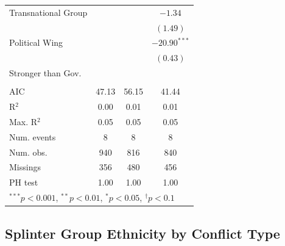 \documentclass[12pt,]{book}
\let\origtable\table
\let\endorigtable\endtable
\renewenvironment{table}[1][2] {
    \singlespacing
    \expandafter\origtable\expandafter[H]
} {
    \endorigtable
}
\theoremstyle{definition}
\theoremstyle{definition}
\theoremstyle{definition}
\theoremstyle{remark}
\begin{document}
\begin{table}
\begin{center}
\begin{tabular}{l c c c }
Transnational Group               &                   &                & $-1.34$        \\
                                  &                   &                & $(1.49)$       \\
Political Wing                    &                   &                & $-20.90^{***}$ \\
                                  &                   &                & $(0.43)$       \\
Stronger than Gov.                &                   &                &                \\
                                  &                   &                &                \\
\hline
AIC                               & 47.13             & 56.15          & 41.44          \\
R$^2$                             & 0.00              & 0.01           & 0.01           \\
Max. R$^2$                        & 0.05              & 0.05           & 0.05           \\
Num. events                       & 8                 & 8              & 8              \\
Num. obs.                         & 940               & 816            & 840            \\
Missings                          & 356               & 480            & 456            \\
PH test                           & 1.00              & 1.00           & 1.00           \\
\hline
\multicolumn{4}{l}{\scriptsize{$^{***}p<0.001$, $^{**}p<0.01$, $^*p<0.05$, $^{\dagger}p<0.1$}}
\end{tabular}
\caption{Cox Proportional Hazard Models of Rebel Group Splintering (Secessionist Conflicts Only)}
\label{tab:survival-sec}
\end{center}
\end{table}

\hypertarget{splinter-group-ethnicity-by-conflict-type}{%
\subsection*{Splinter Group Ethnicity by Conflict
Type}\label{splinter-group-ethnicity-by-conflict-type}}
\end{document}
